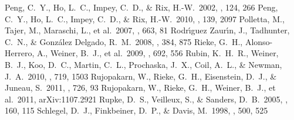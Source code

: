 \documentclass[apj]{emulateapj}
\begin{document}
\begin{thebibliography}{}
 Peng, C.~Y., Ho, L.~C., Impey,
  C.~D., \& Rix, H.-W.\ 2002, \aj, 124, 266
 Peng, C.~Y., Ho, L.~C., Impey,
  C.~D., \& Rix, H.-W.\ 2010, \aj, 139, 2097
 Polletta, M., Tajer, M.,
  Maraschi, L., et al.\ 2007, \apj, 663, 81
  Rodr{\'{\i}}guez Zaur{\'{\i}}n, J., Tadhunter, C.~N., \&
  Gonz{\'a}lez Delgado, R.~M.\ 2008, \mnras, 384, 875
 Rieke, G.~H., Alonso-Herrero, A.,
  Weiner, B.~J., et al.\ 2009, \apj, 692, 556
 Rubin, K.~H.~R., Weiner, B.~J.,
  Koo, D.~C., Martin, C.~L., Prochaska, J.~X., Coil, A.~L., \& Newman,
  J.~A.\ 2010, \apj, 719, 1503
 Rujopakarn, W.,
  Rieke, G.~H., Eisenstein, D.~J., \& Juneau, S.\ 2011, \apj, 726, 93
 Rujopakarn, W., Rieke, G.~H.,
  Weiner, B.~J., et al.\ 2011, arXiv:1107.2921
 Rupke, D.~S., Veilleux, S., \&
  Sanders, D.~B.\ 2005, \apjs, 160, 115 %
 Schlegel, D.~J., Finkbeiner,
  D.~P., \& Davis, M.\ 1998, \apj, 500, 525

\end{thebibliography}
\end{document}
